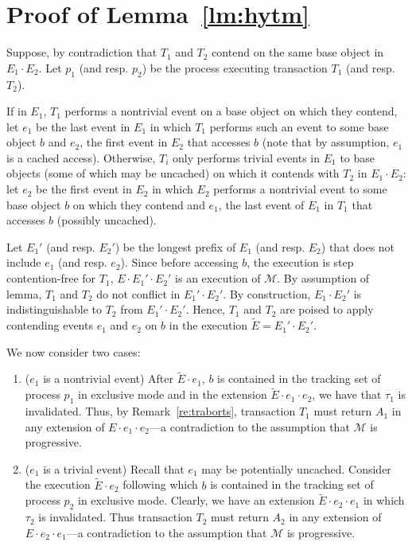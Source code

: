 \section{Proof of Lemma~\ref{lm:hytm}}
\label{app:lm}
Suppose, by contradiction that $T_1$ and $T_2$ 
contend on the same base object in $E_1\cdot E_2$.
Let $p_1$ (and resp. $p_2$) be the process executing transaction $T_1$ (and resp. $T_2$).

If in $E_1$, $T_1$ performs a nontrivial event on a base object on which they contend, let $e_1$ be the last
event in $E_1$ in which $T_1$ performs such an event to some base object $b$ and $e_2$, the first event
in $E_2$ that accesses $b$ (note that by assumption, $e_1$ is a cached access).
Otherwise, $T_i$ only performs trivial events in $E_1$ to base objects (some of which may be uncached) on which it contends with $T_{2}$ in $E_1\cdot E_2$:
let $e_2$ be the first event in $E_2$ in which $E_2$ performs a nontrivial event to some base object $b$
on which they contend and $e_1$, the last event of $E_1$ in $T_1$ that accesses $b$ (possibly uncached).

Let $E_1'$ (and resp. $E_2'$) be the longest prefix of $E_1$ (and resp. $E_2$) that does not include
$e_1$ (and resp. $e_2$).
Since before accessing $b$, the execution is step contention-free for $T_1$, $E \cdot
E_1'\cdot E_2'$ is an execution of $\mathcal{M}$.
By assumption of lemma, $T_1$ and $T_2$ do not conflict in $E_1'\cdot E_2'$.
By construction, $E_1 \cdot E_2'$ is indistinguishable to $T_2$ from $E_1' \cdot E_2'$.
Hence, $T_1$ and $T_{2}$ are poised to apply contending events $e_1$ and $e_2$ on $b$ in the execution
$\tilde E=E_1' \cdot E_2'$.

We now consider two cases:
\begin{enumerate}
\item 
($e_1$ is a nontrivial event)
After $\tilde E\cdot e_1$, $b$ is contained in the tracking set of process
$p_1$ in exclusive mode and in the extension $\tilde E\cdot e_1 \cdot e_2$, we have that
$\tau_1$ is invalidated. Thus, by Remark~\ref{re:traborts}, transaction $T_1$ must return $A_1$ 
in any extension of $E\cdot e_1\cdot e_2$---a contradiction
to the assumption that $\mathcal{M}$ is progressive.   
\item
($e_1$ is a trivial event)
Recall that $e_1$ may be potentially uncached.
Consider the execution $\tilde E\cdot e_2$ following which $b$ is contained in the tracking set of process
$p_{2}$ in exclusive mode. Clearly, we have an extension $\tilde E\cdot e_2 \cdot e_1$ in which
$\tau_{2}$ is invalidated. Thus transaction $T_{2}$ must return $A_{2}$ in any extension of $E\cdot e_2\cdot e_1$---a contradiction
to the assumption that $\mathcal{M}$ is progressive.   
\end{enumerate}
%
